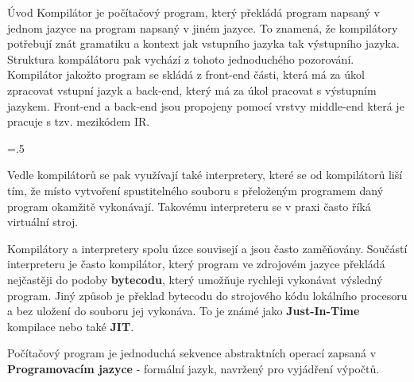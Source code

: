 \chap Úvod
Kompilátor je počítačový program, který překládá program napsaný v jednom jazyce na program napsaný v jiném jazyce. To znamená, že kompilátory potřebují znát gramatiku a kontext jak vstupního jazyka tak výstupního jazyka. Struktura kompálátoru pak vychází z tohoto jednoduchého pozorování. Kompilátor jakožto program se skládá z front-end části, která má za úkol zpracovat vstupní jazyk a back-end, který má za úkol pracovat s výstupním jazykem. Front-end a back-end jsou propojeny pomocí vrstvy middle-end která je pracuje s tzv. mezikódem IR.

\vskip 5mm
\picw=.5\hsize \centerline{ }\nobreak\medskip

Vedle kompilátorů se pak využívají také interpretery, které se od kompilátorů liší tím, že místo vytvoření spustitelného souboru s přeloženým programem daný program okamžitě vykonávají. Takovému interpreteru se v praxi často říká virtuální stroj. 

Kompilátory a interpretery spolu úzce souvisejí a jsou často zaměňovány. Součástí interpreteru je často kompilátor, který program ve zdrojovém jazyce překládá nejčastěji do podoby {\bf bytecodu}, který umožňuje rychleji vykonávat výsledný program. Jiný způsob je překlad bytecodu do strojového kódu lokálního procesoru a bez uložení do souboru jej vykonáva. To je známé jako {\bf Just-In-Time} kompilace nebo také {\bf JIT}.

Počítačový program je jednoduchá sekvence abstraktních operací zapsaná v {\bf Programovacím jazyce} - formální jazyk, navržený pro vyjádření výpočtů. 
 
